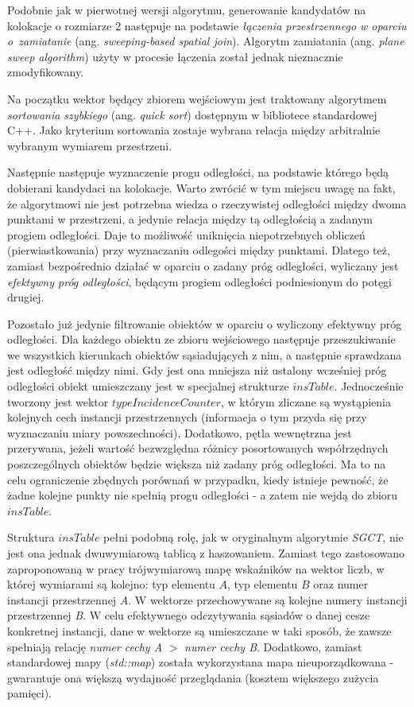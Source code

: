 \documentclass[12pt]{article}
\begin{document}
Podobnie jak w pierwotnej wersji algorytmu, generowanie kandydatów na kolokacje o rozmiarze 2 następuje na podstawie \textit{łączenia przestrzennego w oparciu o~zamiatanie} (ang. \textit{sweeping-based spatial join}). Algorytm zamiatania (ang. \textit{plane sweep algorithm}) użyty w procesie łączenia został jednak nieznacznie zmodyfikowany.

Na początku wektor będący zbiorem wejściowym jest traktowany algorytmem \textit{sortowania szybkiego} (ang. \textit{quick sort}) dostępnym w bibliotece standardowej C++. Jako kryterium sortowania zostaje wybrana relacja między arbitralnie wybranym wymiarem przestrzeni.

Następnie następuje wyznaczenie progu odległości, na podstawie którego będą dobierani kandydaci na kolokacje. Warto zwrócić w tym miejscu uwagę na fakt, że algorytmowi nie jest potrzebna wiedza o rzeczywistej odległości między dwoma punktami w przestrzeni, a jedynie relacja między tą odległością a zadanym progiem odległości. Daje to możliwość uniknięcia niepotrzebnych obliczeń (pierwiastkowania) przy wyznaczaniu odlegości między punktami. Dlatego też, zamiast bezpośrednio działać w oparciu o zadany próg odległości, wyliczany jest \textit{efektywny próg odległości}, będącym progiem odległości podniesionym do potęgi drugiej. 

Pozostało już jedynie filtrowanie obiektów w oparciu o wyliczony efektywny próg odległości. Dla każdego obiektu ze zbioru wejściowego następuje przeszukiwanie we wszystkich kierunkach obiektów sąsiadujących z nim, a następnie sprawdzana jest odległość między nimi. Gdy jest ona mniejsza niż ustalony wcześniej próg odległości obiekt umieszczany jest w specjalnej strukturze $ insTable $. Jednocześnie tworzony jest wektor $ typeIncidenceCounter$, w którym zliczane są wystąpienia kolejnych cech instancji przestrzennych (informacja o tym przyda się przy wyznaczaniu miary powszechności). Dodatkowo, pętla wewnętrzna jest przerywana, jeżeli wartość bezwzględna różnicy posortowanych współrzędnych poszczególnych obiektów będzie większa niż zadany próg odległości. Ma to na celu ograniczenie zbędnych porównań w przypadku, kiedy istnieje pewność, że żadne kolejne punkty nie spełnią progu odległości - a zatem nie wejdą do zbioru $ insTable $.
 
Struktura $ insTable $ pełni podobną rolę, jak w oryginalnym algorytmie \textit{SGCT}, nie jest ona jednak dwuwymiarową tablicą z haszowaniem. Zamiast tego zastosowano zaproponowaną w pracy \cite{plane} trójwymiarową mapę wskaźników na wektor liczb, w której wymiarami są kolejno: typ elementu $ A $, typ elementu $ B $ oraz numer instancji przestrzennej $ A $.  W wektorze przechowywane są kolejne numery instancji przestrzennej \textit{B}. W celu efektywnego odczytywania sąsiadów o danej cesze konkretnej instancji, dane w wektorze są umieszczane w taki sposób, że zawsze spełniają relację \textit{numer cechy A} $ > $ \textit{numer cechy B}. Dodatkowo, zamiast standardowej mapy (\textit{std::map}) została wykorzystana mapa nieuporządkowana - gwarantuje ona większą wydajność przeglądania (kosztem większego zużycia pamięci).
\end{document}
